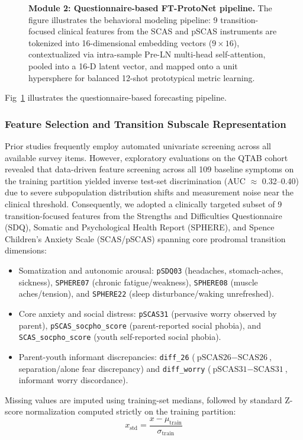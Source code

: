\documentclass[10pt,letterpaper]{article}
\begin{document}
        \begin{figure}[!h]
        \caption{\textbf{Module 2: Questionnaire-based FT-ProtoNet pipeline.}
        The figure illustrates the behavioral modeling pipeline: 9 transition-focused clinical features from the SCAS and pSCAS instruments are tokenized into 16-dimensional embedding vectors ($9 \times 16$), contextualized via intra-sample Pre-LN multi-head self-attention, pooled into a 16-D latent vector, and mapped onto a unit hypersphere for balanced 12-shot prototypical metric learning.}
        \label{fig:module2}
        \end{figure}

        Fig~\ref{fig:module2} illustrates the questionnaire-based forecasting pipeline.

        \subsubsection*{\textbf{Feature Selection and Transition Subscale Representation}}
        Prior studies frequently employ automated univariate screening across all available survey items. However, exploratory evaluations on the QTAB cohort revealed that data-driven feature screening across all 109 baseline symptoms on the training partition yielded inverse test-set discrimination (AUC $\approx$ 0.32--0.40) due to severe subpopulation distribution shifts and measurement noise near the clinical threshold. Consequently, we adopted a clinically targeted subset of 9 transition-focused features from the Strengths and Difficulties Questionnaire (SDQ), Somatic and Psychological Health Report (SPHERE), and Spence Children's Anxiety Scale (SCAS/pSCAS) spanning core prodromal transition dimensions:
        \begin{itemize}
            \item Somatization and autonomic arousal: \texttt{pSDQ03} (headaches, stomach-aches, sickness), \texttt{SPHERE07} (chronic fatigue/weakness), \texttt{SPHERE08} (muscle aches/tension), and \texttt{SPHERE22} (sleep disturbance/waking unrefreshed).
            \item Core anxiety and social distress: \texttt{pSCAS31} (pervasive worry observed by parent), \texttt{pSCAS\_socpho\_score} (parent-reported social phobia), and \texttt{SCAS\_socpho\_score} (youth self-reported social phobia).
            \item Parent-youth informant discrepancies: \texttt{diff\_26} ($\text{pSCAS26} - \text{SCAS26}$, separation/alone fear discrepancy) and \texttt{diff\_worry} ($\text{pSCAS31} - \text{SCAS31}$, informant worry discordance).
        \end{itemize}
        Missing values are imputed using training-set medians, followed by standard Z-score normalization computed strictly on the training partition:
        \begin{equation} \label{eq_rob:2}
        x_{\text{std}} = \frac{x - \mu_{\text{train}}}{\sigma_{\text{train}}}
        \end{equation}
\end{document}
